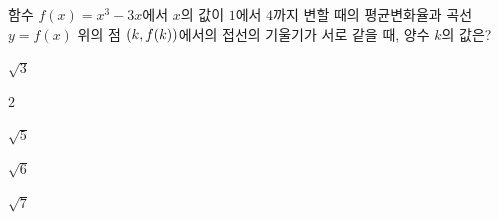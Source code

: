 함수 $f(x)=x^3-3x$에서 $x$의 값이 $1$에서 $4$까지 변할 때의 평균변화율과 곡선 $y=f(x)$ 위의 점 $(k{,}\mkern3mu\mathopen{}f(k))$에서의 접선의 기울기가 서로 같을 때, 양수 $k$의 값은?
\begin{choices32}{\rule[-3ex]{0pt}{8ex}$\sqrt{3}$}{\rule[-3ex]{0pt}{8ex}$2$}{\rule[-3ex]{0pt}{8ex}$\sqrt{5}$}{\rule[-3ex]{0pt}{8ex}$\sqrt{6}$}{\rule[-3ex]{0pt}{8ex}$\sqrt{7}$}\end{choices32}
